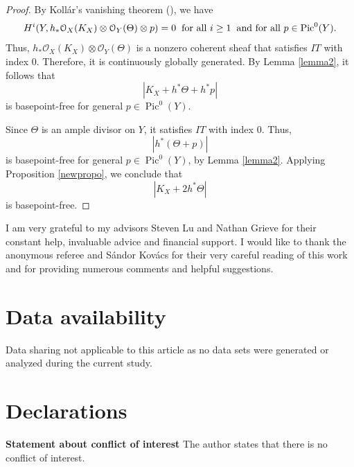 \documentclass[sn-mathphys-num]{sn-jnl}%
\theoremstyle{definition}
\numberwithin{equation}{section}
\begin{document}
\begin{proof}
 \par  By Kollár's vanishing theorem (\cite[Theorem 2.1]{kollarhigherdirect}), we have $$H^{i}(Y, h_{*}\mathcal{O}_{X}(K_{X}) \otimes \mathcal{O}_{Y}(\Theta) \otimes p) = 0 \hspace{0.2cm} \text{for all }  i \geq 1 \hspace{0.2cm} 
    \text{and for all }  p \in \operatorname{Pic}^{0}(Y). $$ Thus, $h_{*}\mathcal{O}_{X}(K_{X}) \otimes \mathcal{O}_{Y}(\Theta)$ is a nonzero coherent sheaf that satisfies $IT$ with index $0$. Therefore, it is continuously globally generated. By Lemma \ref{lemma2}, it follows that
    $$|K_{X} + h^{*}\Theta + h^{*}p|$$ is basepoint-free for general $p \in \operatorname{Pic}^{0}(Y)$. 
\par Since $\Theta$ is an ample divisor on $Y$, it satisfies $IT$ with index $0$.  Thus,  $$|h^{*}(\Theta + p)|$$ is basepoint-free for general $p \in \operatorname{Pic}^{0}(Y)$, by Lemma \ref{lemma2}. Applying Proposition \ref{newpropo}, we conclude that $$|K_{X} + 2 h^{*}\Theta|$$ is basepoint-free.
\end{proof}
I am very grateful to  my advisors Steven Lu and Nathan Grieve for their constant help, invaluable advice and financial support. I would like to thank the anonymous referee and Sándor Kovács for their very careful reading of this work and for providing numerous comments and helpful suggestions.
\section*{Data availability}
Data sharing not applicable to this article as no data sets were generated or analyzed during the current study.
\section*{Declarations}
\textbf{Statement about conﬂict of interest} The author states that there is no conﬂict of interest.
\end{document}
